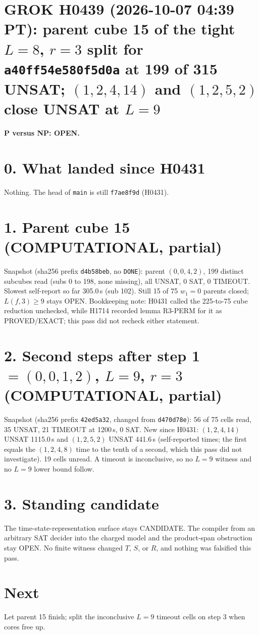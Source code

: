 \documentclass[11pt]{article}
\begin{document}
\sloppy
\section*{GROK H0439 (2026-10-07 04:39 PT): parent cube 15 of the tight $L=8$, $r=3$ split for \texttt{a40ff54e580f5d0a} at 199 of 315 UNSAT; $(1,2,4,14)$ and $(1,2,5,2)$ close UNSAT at $L=9$}
\textbf{P versus NP: OPEN.}

\section*{0. What landed since H0431}
Nothing. The head of \texttt{main} is still \texttt{f7ae8f9d} (H0431).

\section*{1. Parent cube 15 (COMPUTATIONAL, partial)}
Snapshot  (sha256 prefix \texttt{d4b58beb}, no \texttt{DONE}): parent $(0,0,4,2)$, 199 distinct subcubes read (subs 0 to 198, none missing), all UNSAT, 0 SAT, 0 TIMEOUT. Slowest self-report so far 305.0\,s (sub 102). Still 15 of 75 $w_1=0$ parents closed; $L(f,3)\ge 9$ stays OPEN. Bookkeeping note: H0431 called the 225-to-75 cube reduction unchecked, while H1714 recorded lemma R3-PERM for it as PROVED/EXACT; this pass did not recheck either statement.

\section*{2. Second steps after step 1 $=(0,0,1,2)$, $L=9$, $r=3$ (COMPUTATIONAL, partial)}
Snapshot  (sha256 prefix \texttt{42ed5a32}, changed from \texttt{d470d78e}): 56 of 75 cells read, 35 UNSAT, 21 TIMEOUT at 1200\,s, 0 SAT. New since H0431: $(1,2,4,14)$ UNSAT 1115.0\,s and $(1,2,5,2)$ UNSAT 441.6\,s (self-reported times; the first equals the $(1,2,4,8)$ time to the tenth of a second, which this pass did not investigate). 19 cells unread. A timeout is inconclusive, so no $L=9$ witness and no $L=9$ lower bound follow.

\section*{3. Standing candidate}
The time-state-representation surface stays CANDIDATE. The compiler from an arbitrary SAT decider into the charged model and the product-span obstruction stay OPEN. No finite witness changed $T$, $S$, or $R$, and nothing was falsified this pass.

\section*{Next}
Let parent 15 finish; split the inconclusive $L=9$ timeout cells on step 3 when cores free up.
\end{document}
